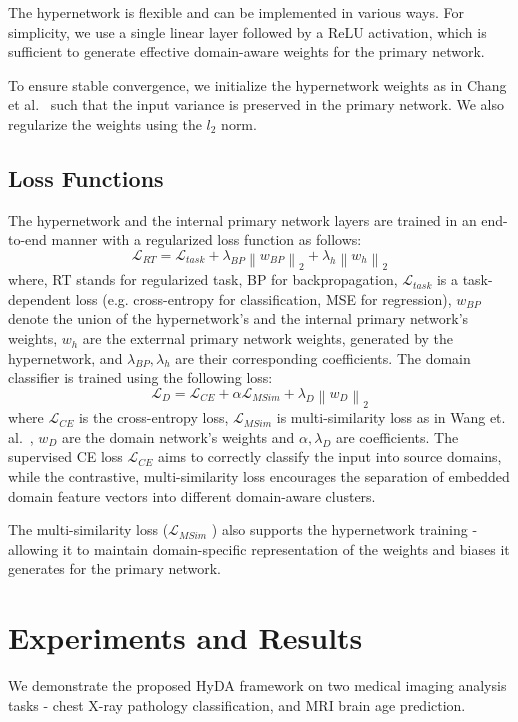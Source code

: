 \documentclass[runningheads]{llncs}
\begin{document}
The hypernetwork is flexible and can be implemented in various ways. For simplicity, we use a single linear layer followed by a ReLU activation, which is sufficient to generate effective domain-aware weights for the primary network.

To ensure stable convergence, we initialize the hypernetwork weights as in Chang et al.~\cite{hyper-weights_init} such that the input variance is preserved in the primary network. We also regularize the weights using the $l_2$ norm. 
\subsection{Loss Functions}
The hypernetwork and the internal primary network layers are trained in an end-to-end manner with a regularized loss function as follows:
\begin{equation}
   \mathcal{L}_{RT} = \mathcal{L}_{task} + \lambda_{BP}\left\| w_{BP}\right\|_2  + \lambda_h\left\|w_h\right\|_2
\end{equation}
where, RT stands for regularized task, BP for backpropagation, $\mathcal{L}_{task}$ is a task-dependent loss (e.g. cross-entropy for classification, MSE for regression), $w_{BP}$ denote the union of the hypernetwork's and the internal primary network's  weights, $w_h$ are the exterrnal primary network weights, generated by the hypernetwork, and $\lambda_{BP}, \lambda_h$ are their corresponding coefficients.
The domain classifier is trained using the following loss:
\begin{equation}
    \mathcal{L}_D = \mathcal{L}_{CE} +\alpha \mathcal{L}_{MSim} + \lambda_D\left\|w_D\right\|_2 
\end{equation}
where $\mathcal{L}_{CE}$ is the cross-entropy loss, $\mathcal{L}_{MSim}$ is multi-similarity loss as in Wang et. al.~\cite{msim_loss}, $w_D$ are the domain network's weights and $\alpha, \lambda_D$ are coefficients. The supervised CE loss $\mathcal{L}_{CE}$ aims to correctly classify the input into source domains, while the contrastive, multi-similarity loss encourages the separation of embedded domain feature vectors into different domain-aware clusters.    

The multi-similarity loss ($\mathcal{L}_{MSim}$ ) also supports the hypernetwork training - allowing it to maintain domain-specific representation of the weights and biases it generates for the primary network.

\section{Experiments and Results}
We demonstrate the proposed HyDA framework on two medical imaging analysis tasks - chest X-ray pathology classification, and MRI brain age prediction.
\end{document}
